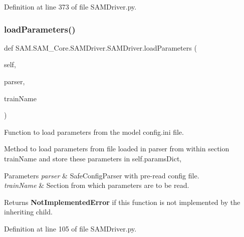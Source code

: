 Definition at line 373 of file S\+A\+M\+Driver.\+py.

\mbox{\label{group__icubclient__SAM__Drivers_gaa44829106cbdec9d9548151582908dce}} 
\subsubsection{\texorpdfstring{load\+Parameters()}{loadParameters()}}
{\footnotesize\ttfamily def S\+A\+M.\+S\+A\+M\+\_\+\+Core.\+S\+A\+M\+Driver.\+S\+A\+M\+Driver.\+load\+Parameters (\begin{DoxyParamCaption}\item[{}]{self,  }\item[{}]{parser,  }\item[{}]{train\+Name }\end{DoxyParamCaption})}



Function to load parameters from the model config.\+ini file. 

Method to load parameters from file loaded in parser from within section train\+Name and store these parameters in self.\+params\+Dict,


\begin{DoxyParams}{Parameters}
{\em parser} & Safe\+Config\+Parser with pre-\/read config file. \\
\hline
{\em train\+Name} & Section from which parameters are to be read.\\
\hline
\end{DoxyParams}
\begin{DoxyReturn}{Returns}
{\bfseries Not\+Implemented\+Error} if this function is not implemented by the inheriting child. 
\end{DoxyReturn}


Definition at line 105 of file S\+A\+M\+Driver.\+py.

\mbox{\label{group__icubclient__SAM__Drivers_ga9e09b2b15fd19eeceef3345c55ffdbdb}} 
